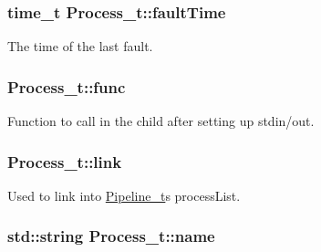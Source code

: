 \subsubsection[{\texorpdfstring{fault\+Time}{faultTime}}]{\setlength{\rightskip}{0pt plus 5cm}time\+\_\+t Process\+\_\+t\+::fault\+Time}\hypertarget{struct_process__t_a30931809987ff384cd4ad0ced6cca943}{}\label{struct_process__t_a30931809987ff384cd4ad0ced6cca943}


The time of the last fault. 

\subsubsection[{\texorpdfstring{func}{func}}]{ Process\+\_\+t\+::func}\hypertarget{struct_process__t_a0a0819cb859d3c1ea4a3149d6f83e776}{}\label{struct_process__t_a0a0819cb859d3c1ea4a3149d6f83e776}


Function to call in the child after setting up stdin/out. 

\subsubsection[{\texorpdfstring{link}{link}}]{ Process\+\_\+t\+::link}\hypertarget{struct_process__t_ab49b4e9b6dd64d01bacfcb9ab185ced0}{}\label{struct_process__t_ab49b4e9b6dd64d01bacfcb9ab185ced0}


Used to link into \hyperlink{struct_pipeline__t}{Pipeline\+\_\+t}\textquotesingle{}s process\+List. 

\subsubsection[{\texorpdfstring{name}{name}}]{\setlength{\rightskip}{0pt plus 5cm}std\+::string Process\+\_\+t\+::name\hspace{0.3cm}{\ttfamily [private]}}\hypertarget{struct_process__t_aa73c8fe5b5e0a59070882a39e988f2fa}{}\label{struct_process__t_aa73c8fe5b5e0a59070882a39e988f2fa}
